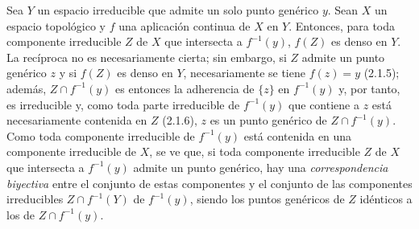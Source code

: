 \begin{env}[2.1.8]
\label{0.2.1.8-fr}
Sea $Y$ un espacio irreducible que admite un solo punto genérico $y$. Sean
$X$ un espacio topológico y $f$ una aplicación continua de $X$ en $Y$.
Entonces, para toda componente irreducible $Z$ de $X$ que intersecta a $f^{-1}(y)$,
$f(Z)$ es denso en $Y$. La recíproca no es necesariamente cierta;
sin embargo, si $Z$ admite un punto genérico $z$ y si $f(Z)$ es denso en
$Y$, necesariamente se tiene $f(z)=y$ (2.1.5); además, $Z\cap f^{-1}(y)$ es
entonces la adherencia de $\{z\}$ en $f^{-1}(y)$ y, por tanto, es irreducible y,
como toda parte irreducible de $f^{-1}(y)$ que contiene a $z$ está
necesariamente contenida en $Z$ (2.1.6), $z$ es un punto genérico de
$Z\cap f^{-1}(y)$. Como toda componente irreducible de $f^{-1}(y)$ está
contenida en una componente irreducible de $X$, se ve que, si toda
componente irreducible $Z$ de $X$ que intersecta a $f^{-1}(y)$ admite un punto
genérico, hay una \emph{correspondencia biyectiva} entre el conjunto de
estas componentes y el conjunto de las componentes irreducibles
$Z\cap f^{-1}(Y)$ de $f^{-1}(y)$, siendo los puntos genéricos de $Z$
idénticos a los de $Z\cap f^{-1}(y)$.
\end{env}
